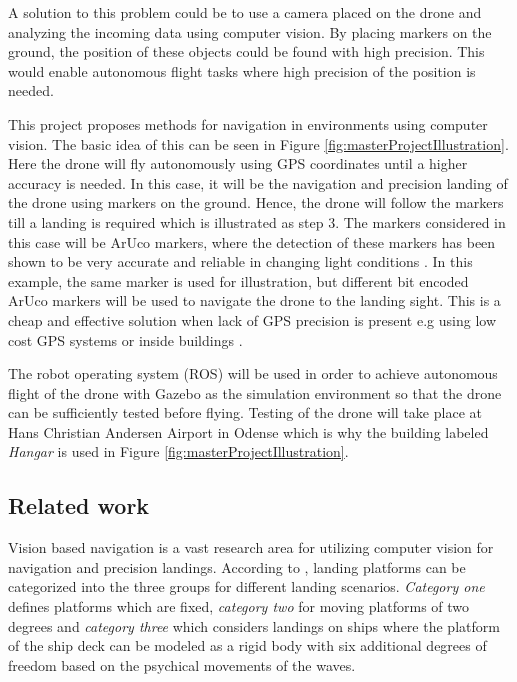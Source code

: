 \documentclass[../Head/report.tex]{subfiles}
\begin{document}
A solution to this problem could be to use a camera placed on the drone and analyzing the incoming data using computer vision. By placing markers on the ground, the position of these objects could be found with high precision. This would enable autonomous flight tasks where high precision of the position is needed.      

This project proposes methods for navigation in environments using computer vision. The basic idea of this can be seen in Figure \ref{fig:masterProjectIllustration}. Here the drone will fly autonomously using GPS coordinates until a higher accuracy is needed. In this case, it will be the navigation and precision landing of the drone using markers on the ground. Hence, the drone will follow the markers till a landing is required which is illustrated as step 3. The markers considered in this case will be ArUco markers, where the detection of these markers has been shown to be very accurate and reliable in changing light conditions \cite{visualmarkers}. In this example, the same marker is used for illustration, but different bit encoded ArUco markers will be used to navigate the drone to the landing sight. This is a cheap and effective solution when lack of GPS precision is present e.g using low cost GPS systems or inside buildings \cite{Visual-Inertial-Navigation}. 

The robot operating system (ROS) will be used in order to achieve autonomous flight of the drone with Gazebo as the simulation environment so that the drone can be sufficiently tested before flying. Testing of the drone will take place at Hans Christian Andersen Airport in Odense which is why the building labeled \textit{Hangar} is used in Figure \ref{fig:masterProjectIllustration}.  

\subsection{Related work}
\label{sec:related_work}

Vision based navigation is a vast research area for utilizing computer vision for navigation and precision landings. According to \cite{OnBoardVisionAutonomousLanding}, landing platforms can be categorized into the three groups for different landing scenarios. \textit{Category one} defines platforms which are fixed, \textit{category two} for moving platforms of two degrees and \textit{category three} which considers landings on ships where the platform of the ship deck can be modeled as a rigid body with six additional degrees of freedom based on the psychical movements of the waves. 
\end{document}

